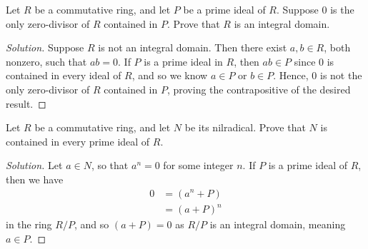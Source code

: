 \documentclass[12pt]{article}
\newenvironment{problem}[2][Problem]{\begin{trivlist}
\item[\hskip \labelsep {\bfseries #1}\hskip \labelsep {\bfseries #2.}]}{\end{trivlist}}
\newenvironment{solution}
  {\renewcommand\qedsymbol{$\blacksquare$}\begin{proof}[Solution]}
{\end{proof}}
\theoremstyle{remark}
\begin{document}
\begin{problem}{4.16}
  Let $R$ be a commutative ring, and let $P$ be a prime ideal of $R$.
  Suppose $0$ is the only zero-divisor of $R$ contained in $P$.
  Prove that $R$ is an integral domain.
\end{problem}
\begin{solution}
  Suppose $R$ is not an integral domain.
  Then there exist $a,b\in R$, both nonzero, such that $ab=0$.
  If $P$ is a prime ideal in $R$, then $ab\in P$ since $0$ is contained
  in every ideal of $R$, and so we know $a\in P$ or $b\in P$. 
  Hence, $0$ is not the only zero-divisor of $R$ contained in $P$,
  proving the contrapositive of the desired result.
\end{solution}

\begin{problem}{4.18}
  Let $R$ be a commutative ring, and let $N$ be its nilradical.
  Prove that $N$ is contained in every prime ideal of $R$.
\end{problem}
\begin{solution}
  Let $a\in N$, so that $a^n = 0$ for some integer $n$.
  If $P$ is a prime ideal of $R$, then we have
  \begin{align*}
    0 &= (a^n + P) \\
    &= (a+P)^n
  \end{align*}
  in the ring $R/P$, and so $(a+P) = 0$ as $R/P$ is an integral domain,
  meaning $a\in P$.
\end{solution}
\end{document}
